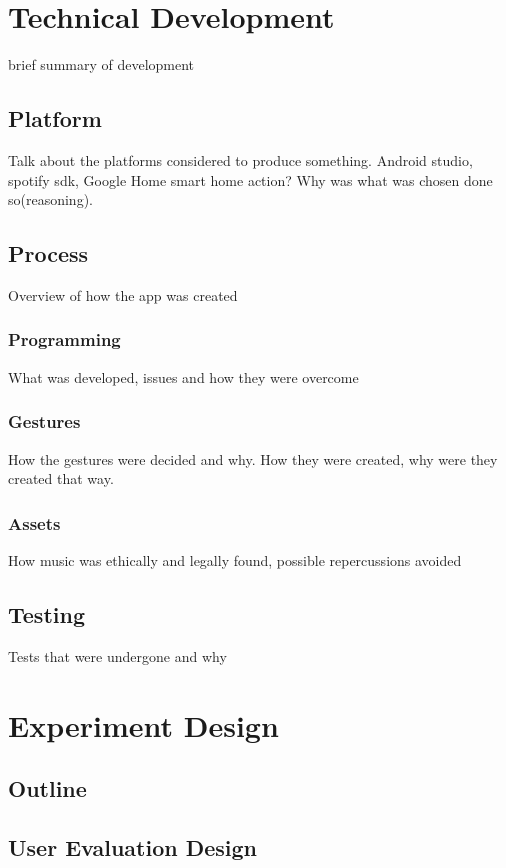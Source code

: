 \documentclass{l4proj}
\begin{document}
\chapter{Technical Development}
brief summary of development
\section{Platform}
Talk about the platforms considered to produce something. Android studio, spotify sdk, Google Home smart home action? Why was what was chosen done so(reasoning).
\section{Process}
Overview of how the app was created
\subsection{Programming}
What was developed, issues and how they were overcome
\subsection{Gestures}
How the gestures were decided and why. How they were created, why were they created that way.
\subsection{Assets}
How music was ethically and legally found, possible repercussions avoided
\section{Testing}
Tests that were undergone and why



\chapter{Experiment Design}

\section{Outline}

\section{User Evaluation Design}
\end{document}
